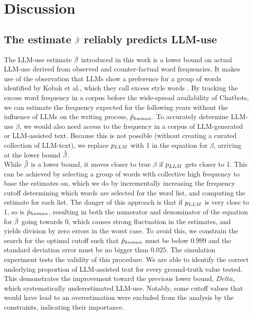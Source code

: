 \chapter{Discussion}\label{sec:discussion}

\section{The estimate $\hat{\beta}$ reliably predicts LLM-use}
The LLM-use estimate $\hat{\beta}$ introduced in this work is a lower bound on actual LLM-use derived from observed and counter-factual word frequencies. 
It makes use of the observation that LLMs show a preference for a group of words identified by Kobak et al., which they call excess style words  \cite{Kobak2025}.
By tracking the excess word frequency in a corpus before the wide-spread availability of Chatbots, we can estimate the frequency expected for the following years without the influence of LLMs on the writing process, $\hat{p}_{human}$. 
To accurately determine LLM-use $\beta$, we would also need access to the frequency in a corpus of LLM-generated or LLM-assisted text.
Because this is not possible (without creating a curated collection of LLM-text), we replace $p_{LLM}$ with 1 in the equation for $\beta$, arriving at the lower bound $\hat{\beta}$.
\\
While $\hat{\beta}$ is a lower bound, it moves closer to true $\beta$ if $p_{LLM}$ gets closer to 1.
This can be achieved by selecting a group of words with collective high frequency to base the estimates on, which we do by incrementally increasing the frequency cutoff determining which words are selected for the word list, and computing the estimate for each list.
The danger of this approach is that if $p_{LLM}$ is very close to 1, so is $\hat{p}_{human}$, resulting in both the numerator and denominator of the equation for $\hat{\beta}$ going towards 0, which causes strong fluctuation in the estimates, and yields division by zero errors in the worst case.
To avoid this, we constrain the search for the optimal cutoff such that $\hat{p}_{human}$ must be below $0.999$ and the standard deviation error must be no bigger than $0.025$.
The simulation experiment tests the validity of this procedure.
We are able to identify the correct underlying proportion of LLM-assisted text for every ground-truth value tested.
This demonstrates the improvement toward the previous lower bound, $Delta$, which systematically underestimated LLM-use. 
Notably, some cutoff values that would have lead to an overestimation were excluded from the analysis by the constraints, indicating their importance.
